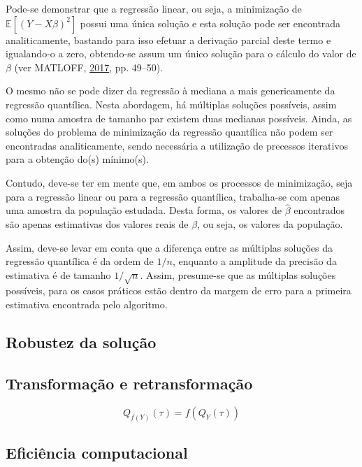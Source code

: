 \documentclass[a4paper, 12pt]{article}
\begin{document}
Pode-se demonstrar que a regressão linear, ou seja, a minimização de
\(\mathbb{E}[(Y - X\beta)^2]\) possui uma única solução e esta solução
pode ser encontrada analiticamente, bastando para isso efetuar a
derivação parcial deste termo e igualando-o a zero, obtendo-se assum um
único solução para o cálculo do valor de \(\beta\) (ver MATLOFF,
\protect\hyperlink{ref-matloff2017}{2017}, pp. 49--50).

O mesmo não se pode dizer da regressão à mediana a mais genericamente da
regressão quantílica. Nesta abordagem, há múltiplas soluções possíveis,
assim como numa amostra de tamanho par existem duas medianas possíveis.
Ainda, as soluções do problema de minimização da regressão quantílica
não podem ser encontradas analiticamente, sendo necessária a utilização
de precessos iterativos para a obtenção do(s) mínimo(s).

Contudo, deve-se ter em mente que, em ambos os processos de minimização,
seja para a regressão linear ou para a regressão quantílica, trabalha-se
com apenas uma amostra da população estudada. Desta forma, os valores de
\(\hat \beta\) encontrados são apenas estimativas dos valores reais de
\(\beta\), ou seja, os valores da população.

Assim, deve-se levar em conta que a diferença entre as múltiplas
soluções da regressão quantílica é da ordem de \(1/n\), enquanto a
amplitude da precisão da estimativa é de tamanho \(1/\sqrt{n}\). Assim,
presume-se que as múltiplas soluções possíveis, para os casos práticos
estão dentro da margem de erro para a primeira estimativa encontrada
pelo algoritmo.

\hypertarget{robustez-da-solucao}{%
\subsection{Robustez da solução}\label{robustez-da-solucao}}

\hypertarget{transformacao-e-retransformacao}{%
\subsection{Transformação e
retransformação}\label{transformacao-e-retransformacao}}

\[Q_{f(Y)}(\tau) = f(Q_Y(\tau))\]

\hypertarget{eficiencia-computacional}{%
\subsection{Eficiência computacional}\label{eficiencia-computacional}}
\end{document}
